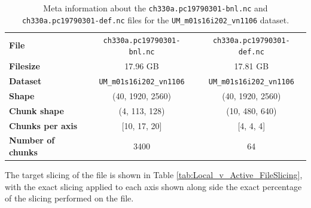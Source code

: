 \documentclass{article}
\begin{document}
\begin{table}[h!] 
    \centering 
    \renewcommand{\arraystretch}{1.1}
    \begin{tabular}{lcc}  \hline
        \textbf{File}                   & \texttt{ch330a.pc19790301-bnl.nc}    & \texttt{ch330a.pc19790301-def.nc}   \\  
        \textbf{Filesize}                   & 17.96  GB  & 17.81  GB   \\  
        \textbf{Dataset}                & \texttt{UM\_m01s16i202\_vn1106}                 &  \texttt{UM\_m01s16i202\_vn1106}                \\ 
        \textbf{Shape}                  & (40, 1920, 2560)                                &  (40, 1920, 2560)                               \\ 
        \textbf{Chunk shape}            & (4, 113, 128)                                   &  (10, 480, 640)                                 \\ 
        \textbf{Chunks per axis}        & [10, 17, 20]                                    &  [4, 4, 4]                                      \\ 
        \textbf{Number of chunks} & 3400                                            &  64                                             \\  \hline
    \end{tabular} 
    \caption{Meta information about the \texttt{ch330a.pc19790301-bnl.nc} and  \texttt{ch330a.pc19790301-def.nc} files for the \texttt{UM\_m01s16i202\_vn1106} dataset.} 
    \label{tab:FileInfo_ch330a.pc19790301-bnl-def.nc} 
\end{table}

The target slicing of the file is shown in Table \ref{tab:Local_v_Active_FileSlicing}, with the exact slicing applied to each axis shown along side the exact percentage of the slicing performed on the file. 
\end{document}
